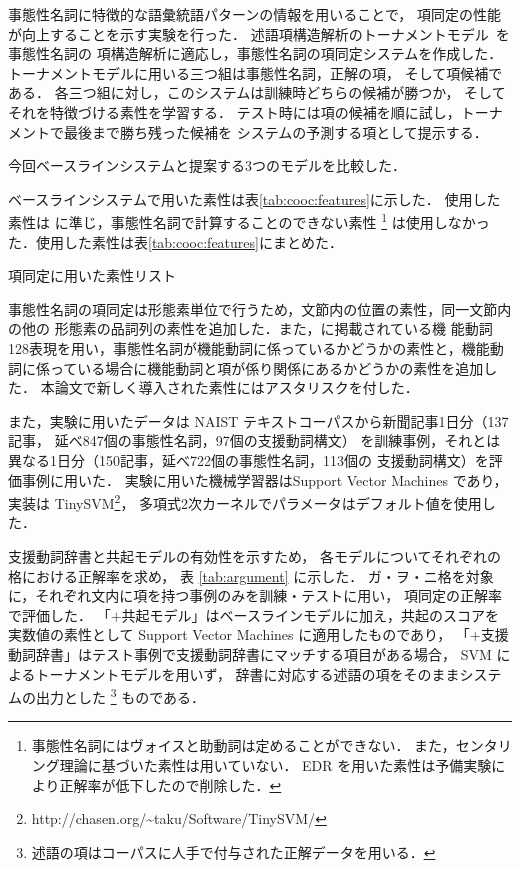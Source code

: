 \documentclass[japanese]{jnlp_1.4}
\begin{document}
事態性名詞に特徴的な語彙統語パターンの情報を用いることで，
項同定の性能が向上することを示す実験を行った．
述語項構造解析のトーナメントモデル~\cite{iida:2005:TALIP}を事態性名詞の
項構造解析に適応し，事態性名詞の項同定システムを作成した．
トーナメントモデルに用いる三つ組は事態性名詞，正解の項，
そして項候補である．
各三つ組に対し，このシステムは訓練時どちらの候補が勝つか，
そしてそれを特徴づける素性を学習する．
テスト時には項の候補を順に試し，トーナメントで最後まで勝ち残った候補を
システムの予測する項として提示する．

今回ベースラインシステムと提案する3つのモデルを比較した．

ベースラインシステムで用いた素性は表\ref{tab:cooc:features}に示した．
使用した素性は 
\cite{iida:2006:ACL} に準じ，事態性名詞で計算することのできない素性
\footnote{事態性名詞にはヴォイスと助動詞は定めることができない．
また，センタリング理論に基づいた素性は用いていない．
EDR を用いた素性は予備実験により正解率が低下したので削除した．}
は使用しなかった．使用した素性は表\ref{tab:cooc:features}にまとめた．

\begin{table}[b]
    \caption{項同定に用いた素性リスト}
    \label{tab:cooc:features}

\end{table}

事態性名詞の項同定は形態素単位で行うため，文節内の位置の素性，同一文節内の他の
形態素の品詞列の素性を追加した．また，\cite{muraki:1990}に掲載されている機
能動詞128表現を用い，事態性名詞が機能動詞に係っているかどうかの素性と，機能動
詞に係っている場合に機能動詞と項が係り関係にあるかどうかの素性を追加した．
本論文で新しく導入された素性にはアスタリスクを付した．

また，実験に用いたデータは NAIST テキストコーパスから新聞記事1日分（137記事，
延べ847個の事態性名詞，97個の支援動詞構文）
を訓練事例，それとは異なる1日分（150記事，延べ722個の事態性名詞，113個の
支援動詞構文）を評価事例に用いた．
実験に用いた機械学習器はSupport Vector Machines \cite{vapnik:1998} であり，
実装は TinySVM\footnote{http://chasen.org/\~{}taku/Software/TinySVM/}，
多項式2次カーネルでパラメータはデフォルト値を使用した．

支援動詞辞書と共起モデルの有効性を示すため，
各モデルについてそれぞれの格における正解率を求め，
表 \ref{tab:argument} に示した．
ガ・ヲ・ニ格を対象に，それぞれ文内に項を持つ事例のみを訓練・テストに用い，
項同定の正解率で評価した．
「$+$共起モデル」はベースラインモデルに加え，共起のスコアを実数値の素性として
Support Vector Machines に適用したものであり，
「$+$支援動詞辞書」はテスト事例で支援動詞辞書にマッチする項目がある場合，
SVM によるトーナメントモデルを用いず，
辞書に対応する述語の項をそのままシステムの出力とした
\footnote{述語の項はコーパスに人手で付与された正解データを用いる．}
ものである．
\end{document}
